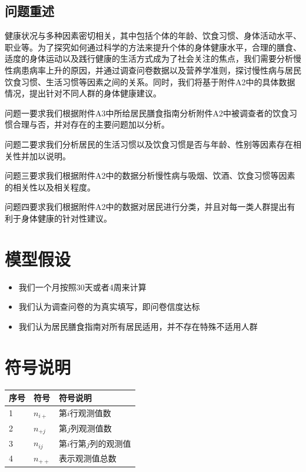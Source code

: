 \documentclass[withoutpreface,bwprint]{cumcmthesis} %
\begin{document}
\subsection{问题重述}


健康状况与多种因素密切相关，其中包括个体的年龄、饮食习惯、身体活动水平、职业等。为了探究如何通过科学的方法来提升个体的身体健康水平，合理的膳食、适度的身体运动以及践行健康的生活方式成为了社会关注的焦点，我们需要分析慢性病患病率上升的原因，并通过调查问卷数据以及营养学准则，探讨慢性病与居民饮食习惯、生活习惯等因素之间的关系。同时，我们将基于附件A2中的具体数据情况，提出针对不同人群的身体健康建议。

问题一要求我们根据附件A3中所给居民膳食指南分析附件A2中被调查者的饮食习惯合理与否，并对存在的主要问题加以分析。

问题二要求我们分析居民的生活习惯以及饮食习惯是否与年龄、性别等因素存在相关性并加以说明。

问题三要求我们根据附件A2中的数据分析慢性病与吸烟、饮酒、饮食习惯等因素的相关性以及相关程度。

问题四要求我们根据附件A2中的数据对居民进行分类，并且对每一类人群提出有利于身体健康的针对性建议。
\section{模型假设}

\begin{itemize}
\item 我们一个月按照30天或者4周来计算
\item 我们认为调查问卷的为真实填写，即问卷信度达标
\item 我们认为居民膳食指南对所有居民适用，并不存在特殊不适用人群
\end{itemize}

\section{符号说明}
\begin{table}[H]
  \centering
  \begin{tabular}{p{60pt}<{\centering}|p{60pt}<{\centering}p{180pt}<{\raggedright}}
   \hline
    序号 & 符号 & 符号说明 \\
   \hline
    1 & $n_{i+}$&第$i$行观测值数\\
    2&$n_{+j}$&第$j$列观测值数\\
    3&$n_{ij}$&第$i$行第$j$列的观测值\\
    4&$n_{++}$&表示观测值总数 \\
    \hline
  \end{tabular}
  \label{symbol}
\end{table}
\end{document}
